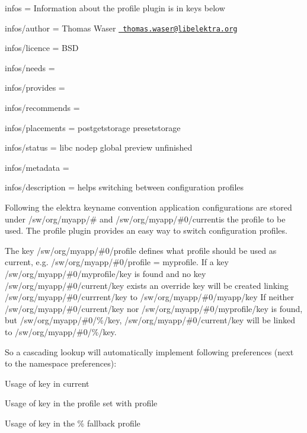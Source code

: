 
\begin{DoxyItemize}
\item infos = Information about the profile plugin is in keys below
\item infos/author = Thomas Waser \href{mailto:thomas.waser@libelektra.org}{\texttt{ thomas.\+waser@libelektra.\+org}}
\item infos/licence = B\+SD
\item infos/needs =
\item infos/provides =
\item infos/recommends =
\item infos/placements = postgetstorage presetstorage
\item infos/status = libc nodep global preview unfinished
\item infos/metadata =
\item infos/description = helps switching between configuration profiles
\end{DoxyItemize}

Following the elektra keyname convention application configurations are stored under {\ttfamily /sw/org/myapp/\#} and {\ttfamily /sw/org/myapp/\#0/current}is the profile to be used. The {\ttfamily profile} plugin provides an easy way to switch configuration profiles.

The key {\ttfamily /sw/org/myapp/\#0/profile} defines what profile should be used as {\ttfamily current}, e.\+g. {\ttfamily /sw/org/myapp/\#0/profile = myprofile}. If a key {\ttfamily /sw/org/myapp/\#0/myprofile/key} is found and no key {\ttfamily /sw/org/myapp/\#0/current/key} exists an override key will be created linking {\ttfamily /sw/org/myapp/\#0/currrent/key} to {\ttfamily /sw/org/myapp/\#0/myapp/key} If neither {\ttfamily /sw/org/myapp/\#0/current/key} nor {\ttfamily /sw/org/myapp/\#0/myprofile/key} is found, but {\ttfamily /sw/org/myapp/\#0/\%/key}, {\ttfamily /sw/org/myapp/\#0/current/key} will be linked to {\ttfamily /sw/org/myapp/\#0/\%/key}.

So a cascading lookup will automatically implement following preferences (next to the namespace preferences)\+:


\begin{DoxyEnumerate}
\item Usage of key in {\ttfamily current}
\item Usage of key in the profile set with {\ttfamily profile}
\item Usage of key in the {\ttfamily \%} fallback profile
\end{DoxyEnumerate}

